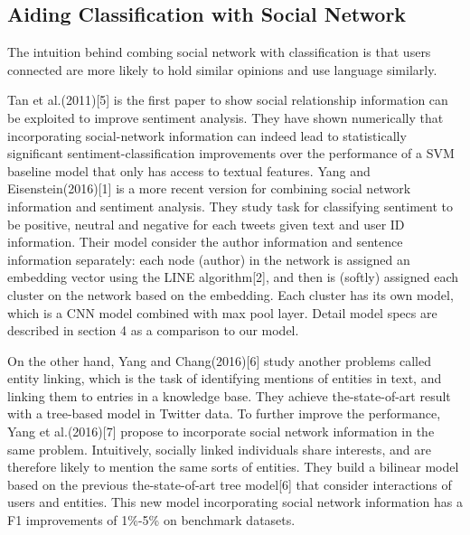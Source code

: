 \subsection*{Aiding Classification with Social Network}

The intuition behind combing social network with classification is that users connected are more likely to hold similar opinions and use language similarly. 

Tan et al.(2011)[5] is the first paper to show social relationship information can be exploited to improve sentiment analysis. They have shown numerically that incorporating social-network information can indeed lead to statistically significant sentiment-classification improvements over the performance of a SVM baseline model that only has access to textual features. Yang and Eisenstein(2016)[1] is a more recent version for combining social network information and sentiment analysis. They study task for classifying sentiment to be positive, neutral and negative for each tweets given text and user ID information. Their model consider the author information and sentence information separately: each node (author) in the network is assigned an embedding vector using the LINE algorithm[2], and then is (softly) assigned each cluster on the network based on the embedding. Each cluster has its own model, which is a CNN model combined with max pool layer. Detail model specs are described in section 4 as a comparison to our model.

On the other hand, Yang and Chang(2016)[6] study another problems called entity linking, which is the task of identifying mentions
of entities in text, and linking them to entries in a knowledge base. They achieve the-state-of-art result with a tree-based model in Twitter data.  To further improve the performance, Yang et al.(2016)[7] propose to incorporate social network information in the same problem. Intuitively, socially linked individuals share interests, and are therefore likely to mention the same sorts of entities. They build a bilinear model based on the previous the-state-of-art tree model[6] that consider interactions of users and entities. This new model incorporating social network information has a F1 improvements of 1\%-5\% on benchmark datasets.
